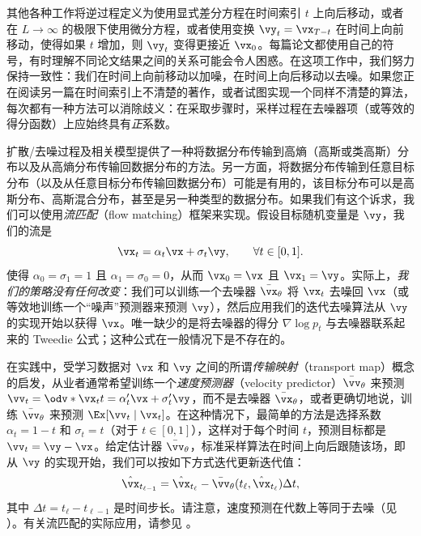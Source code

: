 \documentclass[../../book-main_zh.tex]{subfiles}
\begin{document}
\begin{remark}
    其他各种工作将逆过程定义为使用显式差分方程在时间索引 \(t\) 上向后移动，或者在 \(L \to \infty\) 的极限下使用微分方程，或者使用变换 \(\vy_{t} = \vx_{T - t}\) 在时间上向前移动，使得如果 \(t\) 增加，则 \(\vy_{t}\) 变得更接近 \(\vx_{0}\)。每篇论文都使用自己的符号，有时理解不同论文结果之间的关系可能会令人困惑。在这项工作中，我们努力保持一致性：我们在时间上向前移动以加噪，在时间上向后移动以去噪。如果您正在阅读另一篇在时间索引上不清楚的著作，或者试图实现一个同样不清楚的算法，每次都有一种方法可以消除歧义：在采取步骤时，采样过程在去噪器项（或等效的得分函数）上应始终具有\textit{正}系数。
\end{remark}

\begin{remark}\label{rem:flow_matching}
    扩散/去噪过程及相关模型提供了一种将数据分布传输到高熵（高斯或类高斯）分布以及从高熵分布传输回数据分布的方法。另一方面，将数据分布传输到任意目标分布（以及从任意目标分布传输回数据分布）可能是有用的，该目标分布可以是高斯分布、高斯混合分布，甚至是另一种类型的数据分布。如果我们有这个诉求，我们可以使用\textit{流匹配}（flow matching）框架来实现。假设目标随机变量是 \(\vy\)，我们的流是
    \begin{equation}
        \vx_{t} = \alpha_{t}\vx + \sigma_{t}\vy, \qquad \forall t \in [0, 1].
    \end{equation}
    使得 \(\alpha_{0} = \sigma_{1} = 1\) 且 \(\alpha_{1} =
    \sigma_{0} = 0\)，从而 \(\vx_{0} = \vx\) 且 \(\vx_{1} =
    \vy\)。实际上，\textit{我们的策略没有任何改变}：我们可以训练一个去噪器 \(\bar{\vx}_{\theta}\) 将 \(\vx_{t}\) 去噪回 \(\vx\)（或等效地训练一个“噪声”预测器来预测 \(\vy\)），然后应用我们的迭代去噪算法从 \(\vy\) 的实现开始以获得 \(\vx\)。唯一缺少的是将去噪器的得分 \(\nabla \log p_{t}\) 与去噪器联系起来的 Tweedie 公式；这种公式在一般情况下是不存在的。

    在实践中，受学习数据对 \(\vx\) 和 \(\vy\) 之间的所谓\textit{传输映射}（transport map）概念的启发，从业者通常希望训练一个\textit{速度预测器}（velocity predictor）\(\bar{\vv}_{\theta}\) 来预测 \(\vv_{t} = \odv*{\vx_{t}}{t} =
    \alpha_{t}^{\prime}\vx + \sigma_{t}^{\prime}\vy\)，而不是去噪器 \(\bar{\vx}_{\theta}\)，或者更确切地说，训练 \(\bar{\vv}_{\theta}\) 来预测 \(\Ex[\vv_{t} \mid \vx_{t}]\)。在这种情况下，最简单的方法是选择系数 \(\alpha_{t} = 1 - t\) 和
    \(\sigma_{t} = t\)（对于 \(t \in [0, 1]\)），这样对于每个时间 \(t\)，预测目标都是 \(\vv_{t} = \vy - \vx\)。给定估计器 \(\bar{\vv}_{\theta}\)，标准采样算法在时间上向后跟随该场，即从 \(\vy\) 的实现开始，我们可以按如下方式迭代更新迭代值：
    \begin{equation}
        \hat{\vx}_{t_{\ell - 1}} = \hat{\vx}_{t_{\ell}} -
        \bar{\vv}_{\theta}(t_{\ell}, \hat{\vx}_{t_{\ell}}) \Delta t,
    \end{equation}
    其中 \(\Delta t = t_{\ell} - t_{\ell - 1}\) 是时间步长。请注意，速度预测在代数上等同于去噪（见 ）。有关流匹配的实际应用，请参见 。
\end{remark}
\end{document}
